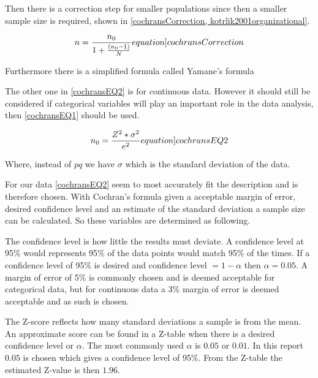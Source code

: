 Then there is a correction step for smaller populations since then a smaller sample size is required, shown in \cref{cochransCorrection, kotrlik2001organizational}.

\begin{equation}
    n = \frac{n_0}{1+\frac{(n_0-1)}{N}}
    \label[equation]{cochransCorrection}
\end{equation}

Furthermore there is a simplified formula called Yamane's formula 


The other one in \cref{cochransEQ2} is for continuous data. However it should still be considered if categorical variables will play an important role in the data analysis, then \cref{cochransEQ1} should be used.

\begin{equation}
    n_0 = \frac{Z^2*\sigma^2}{e^2}
    \label[equation]{cochransEQ2}
\end{equation}

Where, instead of $pq$ we have $\sigma$ which is the standard deviation of the data.




For our data \cref{cochransEQ2} seem to most accurately fit the description and is therefore chosen. With Cochran's formula given a acceptable margin of error, desired confidence level and an estimate of the standard deviation a sample size can be calculated. So these variables are determined as following. 

The confidence level is how little the results must deviate. A confidence level at 95\% would represents 95\% of the data points would match 95\% of the times. If a confidence level of 95\% is desired and confidence level $= 1 - \alpha$ then $\alpha = 0.05$. 
A margin of error of 5\% is commonly chosen and is deemed acceptable for categorical data, but for continuous data a 3\% margin of error is deemed acceptable\cite{kotrlik2001organizational} and as such is chosen.

The Z-score reflects how many standard deviations a sample is from the mean. An approximate score can be found in a Z-table when there is a desired confidence level or $\alpha$. The most commonly used $\alpha$ is $0.05$ or $0.01$.\cite{kotrlik2001organizational} In this report $0.05$ is chosen which gives a confidence level of 95\%. From the Z-table the estimated Z-value is then $1.96$. 

